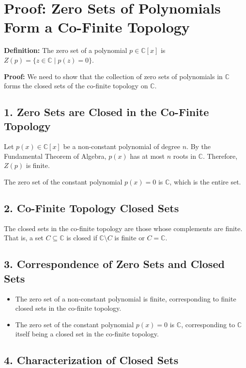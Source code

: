 \section*{Proof: Zero Sets of Polynomials Form a Co-Finite Topology}

\textbf{Definition:} The zero set of a polynomial \(p \in \mathbb{C}[x]\) is \(Z(p) = \{ z \in \mathbb{C} \mid p(z) = 0 \}\).

\textbf{Proof:} We need to show that the collection of zero sets of polynomials in \(\mathbb{C}\) forms the closed sets of the co-finite topology on \(\mathbb{C}\).

\subsection*{1. Zero Sets are Closed in the Co-Finite Topology}

Let \(p(x) \in \mathbb{C}[x]\) be a non-constant polynomial of degree \(n\). By the Fundamental Theorem of Algebra, \(p(x)\) has at most \(n\) roots in \(\mathbb{C}\). Therefore, \(Z(p)\) is finite.

The zero set of the constant polynomial \(p(x) = 0\) is \(\mathbb{C}\), which is the entire set.

\subsection*{2. Co-Finite Topology Closed Sets}

The closed sets in the co-finite topology are those whose complements are finite. That is, a set \(C \subseteq \mathbb{C}\) is closed if \(\mathbb{C} \setminus C\) is finite or \(C = \mathbb{C}\).

\subsection*{3. Correspondence of Zero Sets and Closed Sets}

\begin{itemize}
	\item The zero set of a non-constant polynomial is finite, corresponding to finite closed sets in the co-finite topology.
	\item The zero set of the constant polynomial \(p(x) = 0\) is \(\mathbb{C}\), corresponding to \(\mathbb{C}\) itself being a closed set in the co-finite topology.
\end{itemize}

\subsection*{4. Characterization of Closed Sets}

